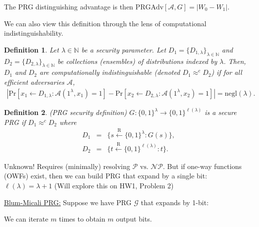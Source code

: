 \documentclass{article}
\newtheorem{definition}{Definition}
\begin{document}
The PRG distinguishing advantage is then $\mathrm{PRGAdv}[\mathcal{A},G] = |W_0-W_1|$.

We can also view this definition through the lens of computational indistinguishability.
\begin{definition}
Let $\lambda \in \mathbb{N}$ be a security parameter. Let $D_1 = \{ D_{1,\lambda} \}_{\lambda \in \mathbb{N}}$ and $D_2 = \{ D_{2,\lambda} \}_{\lambda \in \mathbb{N}}$ be collections (ensembles) of distributions indexed by $\lambda$. Then, $D_1$ and $D_2$ are computationally indistinguishable (denoted $D_1 {\approx}^{c} D_2$) if for all efficient adversaries $\mathcal{A}$,
\begin{eqnarray*}
    |\mathrm{Pr}[x_1 \leftarrow D_{1,\lambda}:\mathcal{A}(1^{\lambda},x_1)=1] - \mathrm{Pr}[x_2 \leftarrow D_{2,\lambda}:\mathcal{A}(1^{\lambda},x_2)=1]| = \mathrm{negl}(\lambda).
\end{eqnarray*}
\end{definition}

\begin{definition}
(PRG security definition) $G: \{ 0,1 \}^{\lambda} \rightarrow \{ 0,1 \}^{\ell(\lambda)}$ is a secure PRG if $D_1 {\approx}^{c} D_2$ where 
\begin{eqnarray*}
     D_1 &=& \{ s \overset{\mathrm{R}}{\leftarrow} \{ 0,1 \}^{\lambda}: G(s) \}, \nonumber \\
     D_2 &=& \{ t \overset{\mathrm{R}}{\leftarrow} \{ 0,1 \}^{\ell(\lambda)}: t \}. \nonumber 
\end{eqnarray*}
\end{definition}

\noindent {\color{purple} {Question: Do PRGs exist?}} 

Unknown! Requires (minimally) resolving $\mathcal{P} \text{ vs. } \mathcal{NP}$.
But if one-way functions (OWFs) exist, then we can build PRG that expand by a single bit: $\ell(\lambda) = \lambda+1$ (Will explore this on HW1, Problem 2)
\\

\noindent {\color{purple} {Question: How to go from one-bit PRG to multi-bit PRG?}} 

\underline{Blum-Micali PRG:} Suppose we have PRG $\mathcal{G}$ that expands by 1-bit:



We can iterate $m$ times to obtain $m$ output bits.
\\

\noindent {\color{purple} {Question: Is this construction secure?}} 
\end{document}
